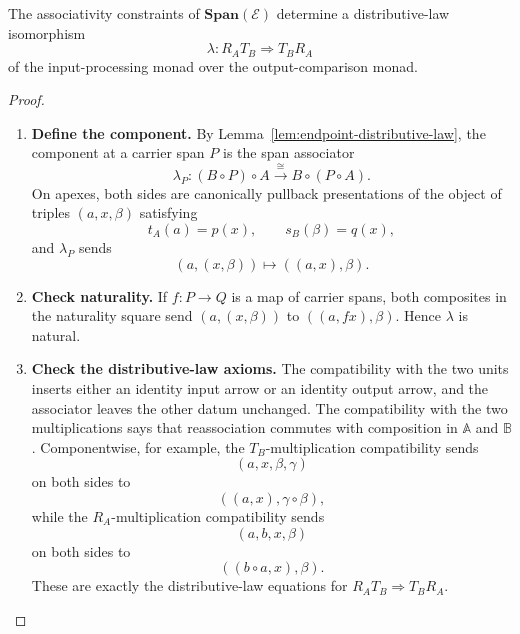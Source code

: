 \begin{proposition}
\label{prop:canonical-distributive-law}
    The associativity constraints of \(\mathbf{Span}(\mathcal E)\) determine a distributive-law isomorphism
    \[
        \lambda:R_A T_B\Rightarrow T_B R_A
    \]
    of the input-processing monad over the output-comparison monad.
\end{proposition}
\begin{proof}
    \leavevmode
    \begin{enumerate}
        \item \textbf{Define the component.} By Lemma~\ref{lem:endpoint-distributive-law}, the component at a carrier span \(P\) is the span associator
        \[
            \lambda_P:
            (B\circ P)\circ A
            \xrightarrow{\cong}
            B\circ(P\circ A).
        \]
        On apexes, both sides are canonically pullback presentations of the object of triples \((a,x,\beta)\) satisfying
        \[
            t_A(a)=p(x),
            \qquad
            s_B(\beta)=q(x),
        \]
        and \(\lambda_P\) sends
        \[
            (a,(x,\beta))
            \longmapsto
            ((a,x),\beta).
        \]

        \item \textbf{Check naturality.} If \(f:P\to Q\) is a map of carrier spans, both composites in the naturality square send \((a,(x,\beta))\) to \(((a,fx),\beta)\). Hence \(\lambda\) is natural.

        \item \textbf{Check the distributive-law axioms.} The compatibility with the two units inserts either an identity input arrow or an identity output arrow, and the associator leaves the other datum unchanged. The compatibility with the two multiplications says that reassociation commutes with composition in \(\mathbb A\) and \(\mathbb B\). Componentwise, for example, the \(T_B\)-multiplication compatibility sends
        \[
            (a,x,\beta,\gamma)
        \]
        on both sides to
        \[
            ((a,x),\gamma\circ\beta),
        \]
        while the \(R_A\)-multiplication compatibility sends
        \[
            (a,b,x,\beta)
        \]
        on both sides to
        \[
            ((b\circ a,x),\beta).
        \]
        These are exactly the distributive-law equations for \(R_AT_B\Rightarrow T_BR_A\).
    \end{enumerate}
\end{proof}

